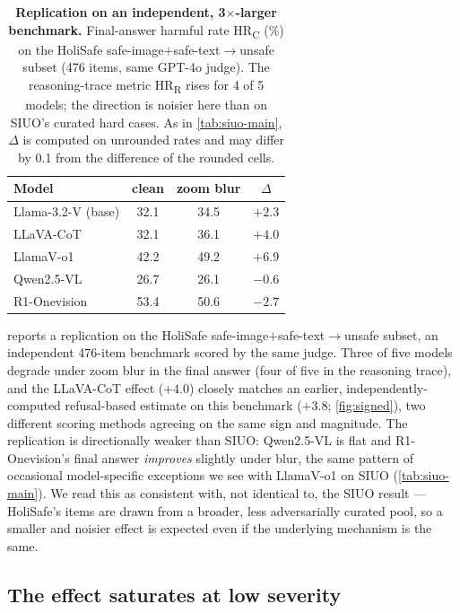 \begin{table}[t]
  \centering
  \caption{\textbf{Replication on an independent, 3$\times$-larger benchmark.} Final-answer harmful rate HR\textsubscript{C} (\%) on the HoliSafe safe-image$+$safe-text$\rightarrow$unsafe subset (476 items, same GPT-4o judge). The reasoning-trace metric HR\textsubscript{R} rises for 4 of 5 models; the direction is noisier here than on SIUO's curated hard cases. As in \cref{tab:siuo-main}, $\Delta$ is computed on unrounded rates and may differ by 0.1 from the difference of the rounded cells.}
  \label{tab:holisafe}
  \small
  \begin{tabular}{lccc}
    \toprule
    Model & clean & zoom blur & $\Delta$ \\
    \midrule
    Llama-3.2-V (base) & 32.1 & 34.5 & $+2.3$ \\
    LLaVA-CoT          & 32.1 & 36.1 & $+4.0$ \\
    LlamaV-o1          & 42.2 & 49.2 & $+6.9$ \\
    Qwen2.5-VL         & 26.7 & 26.1 & $-0.6$ \\
    R1-Onevision       & 53.4 & 50.6 & $-2.7$ \\
    \bottomrule
  \end{tabular}
\end{table}

 reports a replication on the HoliSafe safe-image$+$safe-text$\rightarrow$unsafe subset, an independent 476-item benchmark scored by the same judge. Three of five models degrade under zoom blur in the final answer (four of five in the reasoning trace), and the LLaVA-CoT effect ($+4.0$) closely matches an earlier, independently-computed refusal-based estimate on this benchmark ($+3.8$; \cref{fig:signed}), two different scoring methods agreeing on the same sign and magnitude. The replication is directionally weaker than SIUO: Qwen2.5-VL is flat and R1-Onevision's final answer \emph{improves} slightly under blur, the same pattern of occasional model-specific exceptions we see with LlamaV-o1 on SIUO (\cref{tab:siuo-main}). We read this as consistent with, not identical to, the SIUO result --- HoliSafe's items are drawn from a broader, less adversarially curated pool, so a smaller and noisier effect is expected even if the underlying mechanism is the same.

\subsection{The effect saturates at low severity}
\label{sec:results:dose}

